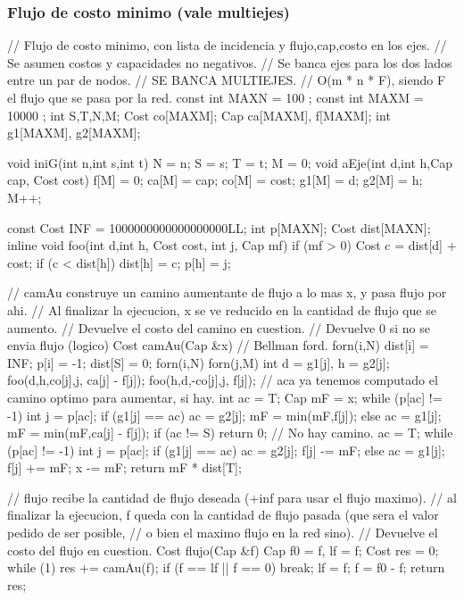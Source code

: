 \documentclass[10pt,landscape,twocolumn,a4paper,notitlepage]{article}
\begin{document}
\subsubsection{Flujo de costo minimo (vale multiejes)}
\begin{code}
// Flujo de costo minimo, con lista de incidencia y flujo,cap,costo en los ejes.
// Se asumen costos y capacidades no negativos.
// Se banca ejes para los dos lados entre un par de nodos.
// SE BANCA MULTIEJES.
// O(m * n * F), siendo F el flujo que se pasa por la red.
const int MAXN = 100 ;
const int MAXM = 10000 ;
int S,T,N,M;
Cost co[MAXM];
Cap ca[MAXM], f[MAXM];
int g1[MAXM], g2[MAXM];

void iniG(int n,int s,int t) { N = n; S = s; T = t; M = 0; }
void aEje(int d,int h,Cap cap, Cost cost) {
	f[M] = 0;
	ca[M] = cap;
	co[M] = cost;
	g1[M] = d;
	g2[M] = h;
	M++;
}

const Cost INF = 1000000000000000000LL;
int p[MAXN];
Cost dist[MAXN];
inline void foo(int d,int h, Cost cost, int j, Cap mf) {
	if (mf > 0)	{
		Cost c = dist[d] + cost;
		if (c < dist[h]) { dist[h] = c; p[h] = j; }
	}
}

// camAu construye un camino aumentante de flujo a lo mas x, y pasa flujo por ahi.
// Al finalizar la ejecucion, x se ve reducido en la cantidad de flujo que se aumento.
// Devuelve el costo del camino en cuestion.
// Devuelve 0 si no se envia flujo (logico)
Cost camAu(Cap &x) {
	// Bellman ford.
	forn(i,N) {dist[i] =  INF; p[i] = -1;}
	dist[S] = 0;
	forn(i,N) forn(j,M) {
		int d = g1[j], h = g2[j];
		foo(d,h,co[j],j, ca[j] - f[j]);
		foo(h,d,-co[j],j, f[j]);
	} // aca ya tenemos computado el camino optimo para aumentar, si hay.
	int ac = T;
    Cap mF = x;
	while (p[ac] != -1)	{
		int j = p[ac];
		if (g1[j] == ac) { ac = g2[j]; mF = min(mF,f[j]);}
		else             { ac = g1[j]; mF = min(mF,ca[j] - f[j]); }
	}
	if (ac != S) return 0; // No hay camino.
	ac = T;
	while (p[ac] != -1) {
		int j = p[ac];
		if (g1[j] == ac) { ac = g2[j]; f[j] -= mF; }
		else             { ac = g1[j]; f[j] += mF; }
	}
	x -= mF;
	return mF * dist[T];
}

// flujo recibe la cantidad de flujo deseada (+inf para usar el flujo maximo).
// al finalizar la ejecucion, f queda con la cantidad de flujo pasada (que sera el valor pedido de ser posible,
// o bien el maximo flujo en la red sino).
// Devuelve el costo del flujo en cuestion.
Cost flujo(Cap &f) {
	Cap f0 = f, lf = f;
    Cost res = 0;
	while (1) {
		res += camAu(f);
		if (f == lf || f == 0) break;
		lf = f;
	}
	f = f0 - f;
	return res;
}
\end{code}
\end{document}
